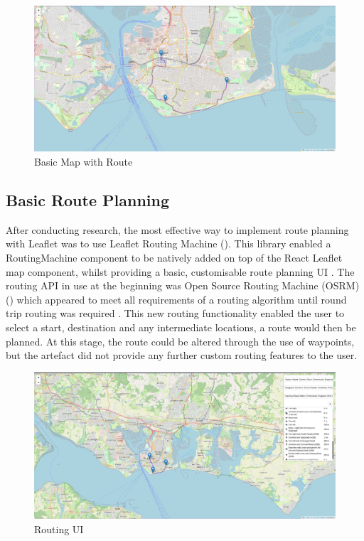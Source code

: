 \begin{figure}[!ht]
    \centering
    \includegraphics[width=425px]{figures/Progress Images/Iteration-1/SR25/Basic Route.png}
    \caption{Basic Map with Route}
    \label{fig:basic-map-with-route}
\end{figure}

\subsection{Basic Route Planning}
\label{iteration1:basic-routing}
After conducting research, the most effective way to implement route planning with Leaflet was to use Leaflet Routing Machine (\cite{noauthor_leaflet_nodate-1}). This library enabled a RoutingMachine component to be natively added on top of the React Leaflet map component, whilst providing a basic, customisable route planning UI . The routing API in use at the beginning was Open Source Routing Machine (OSRM) (\cite{noauthor_project_nodate}) which appeared to meet all requirements of a routing algorithm until round trip routing was required . This new routing functionality enabled the user to select a start, destination and any intermediate locations, a route would then be planned. At this stage, the route could be altered through the use of waypoints, but the artefact did not provide any further custom routing features to the user.
\begin{figure}[!ht]
    \centering
    \includegraphics[width=425px]{figures/Progress Images/Iteration-1/SR1/Basic Destination Overlay Set up.png}
    \caption{Routing UI}
    \label{fig:routing-ui}
  \end{figure}

